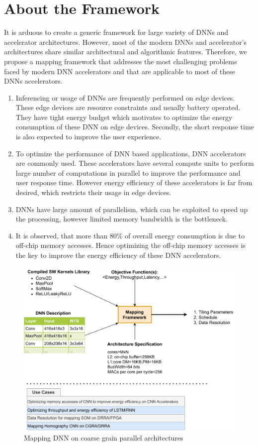 \documentclass[a4paper,10pt]{article}
\begin{document}
\section{About the Framework}
It is arduous to create a generic framework for large variety of DNNs and accelerator architectures. However, most of the modern DNNs and accelerator's architectures share similar architectural and algorithmic features. Therefore, we propose a mapping framework that addresses the most challenging problems faced by modern DNN accelerators and that are applicable to most of these DNNs accelerators.
\begin{enumerate}
	\item Inferencing or usage of DNNs are frequently performed on edge devices. These edge devices  are resource constraints and usually battery operated. They have tight energy budget which motivates to optimize the energy consumption of these DNN on edge devices. Secondly, the short response time is also expected to improve the user experience.
   \item To optimize the performance of DNN based applications, DNN accelerators are commonly used. These accelerators have several compute units to perform large number of computations in parallel to improve the performance and user response time. However energy efficiency of these accelerators is far from desired, which restricts their usage in edge devices.
   \item DNNs have large amount of parallelism, which can be exploited to speed up the processing, however limited memory bandwidth is the bottleneck. 
   \item It is observed, that more than 80\% of overall energy consumption is due to off-chip memory accesses. Hence optimizing the off-chip memory accesses is the key to improve the energy efficiency of these DNN accelerators.
\end{enumerate}
\begin{figure}[ht]
	\centering
	\includegraphics[width=\linewidth]{./images/blockDiagram}
	\caption{Mapping DNN on coarse grain parallel architectures}
	\label{fig:introduction}
\end{figure}
\end{document}
